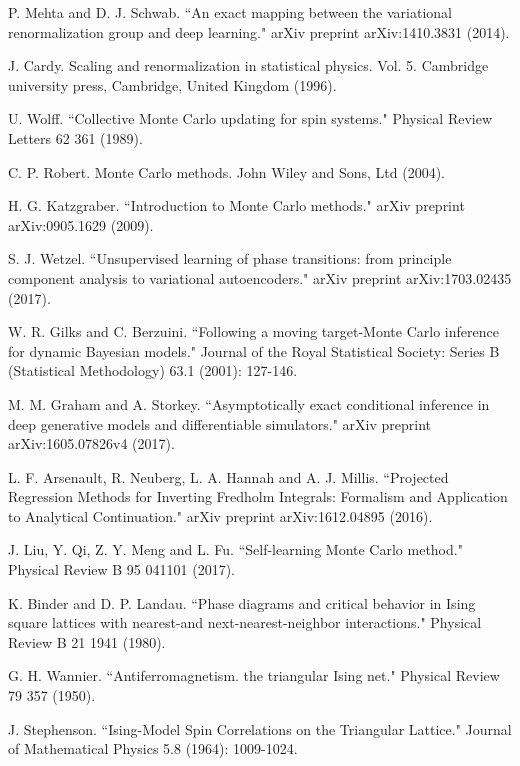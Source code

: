 \documentclass[pra,letterpaper,10pt,twocolumn]{revtex4}
\begin{document}
\begin{thebibliography}{100}
P. Mehta and D. J. Schwab. ``An exact mapping between the variational renormalization group and deep learning." arXiv preprint arXiv:1410.3831 (2014).

J. Cardy. Scaling and renormalization in statistical physics. Vol. 5. Cambridge university press, Cambridge, United Kingdom (1996).

U. Wolff. ``Collective Monte Carlo updating for spin systems." Physical Review Letters 62 361 (1989).

C. P. Robert. Monte Carlo methods. John Wiley and Sons, Ltd (2004).

H. G. Katzgraber. ``Introduction to Monte Carlo methods." arXiv preprint arXiv:0905.1629 (2009).

S. J. Wetzel. ``Unsupervised learning of phase transitions: from principle component analysis to variational autoencoders." arXiv preprint arXiv:1703.02435 (2017).

W. R. Gilks and C. Berzuini. ``Following a moving target-Monte Carlo inference for dynamic Bayesian models." Journal of the Royal Statistical Society: Series B (Statistical Methodology) 63.1 (2001): 127-146.

M. M. Graham and A. Storkey. ``Asymptotically exact conditional inference in deep generative models and differentiable simulators." arXiv preprint arXiv:1605.07826v4 (2017).

L. F. Arsenault, R. Neuberg, L. A. Hannah and A. J. Millis. ``Projected Regression Methods for Inverting Fredholm Integrals: Formalism and Application to Analytical Continuation." arXiv preprint arXiv:1612.04895 (2016).

J. Liu, Y. Qi, Z. Y. Meng and L. Fu. ``Self-learning Monte Carlo method." Physical Review B 95 041101 (2017).

K. Binder and D. P. Landau. ``Phase diagrams and critical behavior in Ising square lattices with nearest-and next-nearest-neighbor interactions." Physical Review B 21 1941 (1980).

G. H. Wannier. ``Antiferromagnetism. the triangular Ising net." Physical Review 79 357 (1950).

J. Stephenson. ``Ising-Model Spin Correlations on the Triangular Lattice." Journal of Mathematical Physics 5.8 (1964): 1009-1024.


\end{thebibliography}
\end{document}
